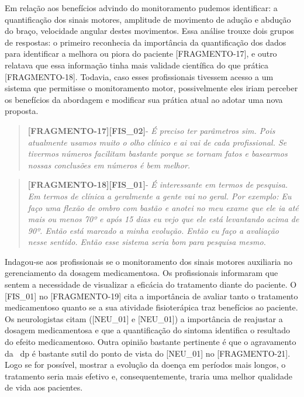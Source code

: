 Em relação aos benefícios advindo do monitoramento pudemos identificar: a quantificação dos sinais motores, amplitude de movimento de adução e abdução do braço,  velocidade angular destes movimentos. Essa análise trouxe dois grupos de respostas: o primeiro reconhecia da importância da quantificação dos dados para identificar a melhora ou piora do paciente [FRAGMENTO-17], e outro relatava que essa informação tinha mais validade científica do que prática [FRAGMENTO-18]. Todavia, caso esses profissionais tivessem acesso a um sistema que permitisse o monitoramento motor, possivelmente eles iriam perceber os benefícios da abordagem e modificar sua prática atual ao adotar uma nova proposta.

\begin{quote}
\textbf{[FRAGMENTO-17][FIS\_02]}-
\emph{
É preciso ter parâmetros sim. Pois atualmente usamos muito o olho clínico e ai vai de cada profissional. Se tivermos números facilitam bastante porque se tornam fatos e basearmos nossas conclusões em números é bem melhor.
}
\end{quote}

\begin{quote}
\textbf{[FRAGMENTO-18][FIS\_01]}-
\emph{
É interessante em termos de pesquisa. Em termos de clínica a geralmente a gente vai no geral. Por exemplo: Eu faço uma flexão de ombro com bastão e anotei no meu exame que ele ia até mais ou menos 70º e após 15 dias eu vejo que ele está levantando acima de 90º. Então está marcado a minha evolução. Então eu faço a avaliação nesse sentido. Então esse sistema seria bom para pesquisa mesmo.
}
\end{quote}

Indagou-se aos profissionais se o monitoramento dos sinais motores auxiliaria no gerenciamento da dosagem medicamentosa. Os profissionais informaram que sentem a necessidade de visualizar a eficácia do tratamento diante do paciente. O [FIS\_01] no [FRAGMENTO-19] cita a importância de avaliar tanto o tratamento medicamentoso quanto se a sua atividade fisioterápica traz benefícios ao paciente. Os neurologistas citam ([NEU\_01] e [NEU\_01]) a importância de reajustar a dosagem medicamentosa e que a quantificação do sintoma identifica o resultado do efeito medicamentoso. Outra opinião bastante pertinente é que o agravamento da ~\ac{dp} é bastante sutil do ponto de vista do [NEU\_01] no [FRAGMENTO-21]. Logo se for possível, mostrar a evolução da doença em períodos mais longos, o tratamento seria mais efetivo e, consequentemente, traria uma melhor qualidade de vida aos pacientes.

